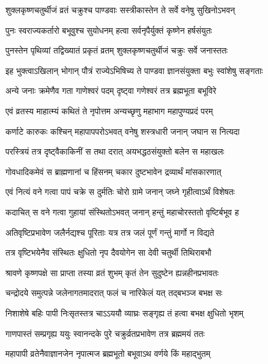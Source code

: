 \twolineshloka
{शुक्लकृष्णचतुर्थीजं व्रतं चक्रुश्च पाण्डवाः}
{सस्त्रीकास्तेन ते सर्वे वनेषु सुखिनोऽभवन्} %

\twolineshloka
{पुनः स्वराज्यकर्तारो बभूवुश्च सुयोधनम्}
{हत्वा सर्वनृपैर्युक्तं कृष्णेन हर्षसंयुतः} %

\twolineshloka
{पुनस्तेन पृथिव्यां तद्विख्यातं प्रकृतं व्रतम्}
{शुक्लकृष्णचतुर्थीजं चक्रुः सर्वे जनास्ततः} %

\twolineshloka
{इह भुक्त्वाऽखिलान् भोगान् पौत्रं राज्येऽभिषिच्य ते}
{पाण्डवा ज्ञानसंयुक्ता बभुः स्वांशेषु सङ्गताः} %

\twolineshloka
{अन्ये जनाः क्रमेणैव गता गाणेश्वरं पदम्}
{दृष्ट्वा गणेश्वरं तत्र ब्रह्मभूता बभूविरे} %

\twolineshloka
{एवं व्रतस्य माहात्म्यं कथितं ते नृपोत्तम}
{अन्यच्छृणु महाभाग महापुण्यप्रदं परम्} %

\twolineshloka
{कर्णाटे कारुकः कश्चिन् महापापपरोऽभवत्}
{वनेषु शस्त्रधारी जनान् जघान स नित्यदा} %

\twolineshloka
{परस्त्रियं तत्र दृष्ट्वैकाकिनीं स तथा दरात्}
{अयभद्धठसंयुक्तो बलेन स महाखलः} %

\twolineshloka
{गोवधादिकमेवं स ब्राह्मणानां च हिंसनम्}
{चकार दुष्टभावेन द्रव्यार्थं मांसकारणात्} %

\twolineshloka
{एवं नित्यं वने गत्वा पापं चक्रे स दुर्मतिः}
{चोरो ग्रामे जनान् जघ्ने गृहीत्वाऽर्थं विशेषतः} %

\twolineshloka
{कदाचित् स वने गत्वा गुहायां संस्थितोऽभवत्}
{जनान् हन्तुं महाचोरस्ततो वृष्टिर्बभूव ह} %

\twolineshloka
{अतिवृष्टिप्रभावेण जलैर्नद्यश्च पूरिताः}
{यत्र तत्र जलं पूर्णं गन्तुं मार्गो न विद्यते} %

\twolineshloka
{तत्र वृष्टिभयेनैव संस्थितः क्षुधितो नृप}
{दैवयोगेन सा देवी चतुर्थी तिथिराबभौ} %

\twolineshloka
{श्रावणे कृष्णपक्षे सा प्राप्ता तस्या व्रतं शुभम्}
{कृतं तेन सुदुष्टेन ह्यन्नहीनप्रभावतः} %

\twolineshloka
{चन्द्रोदये समुत्पन्ने जलेनागतमादरात्}
{फलं च नारिकेलं यत् तद्बभञ्ज बभक्ष सः} %

\twolineshloka
{निशाशेषे बहिः पापी निःसृतस्तत्र चाऽऽययौ}
{व्याघ्रः सङ्गृह्य तं हत्वा बभक्ष क्षुधितो भृशम्} %

\twolineshloka
{गाणपास्तं सम्प्रगृह्य ययुः स्वानन्दके पुरे}
{चक्रुर्व्रतप्रभावेण तत्र ब्रह्ममयं ततः} %

\twolineshloka
{महापापी व्रतेनैवाज्ञानजेन नृपात्मज}
{ब्रह्मभूतो बभूवाऽथ वर्णये किं महाद्भुतम्} %

